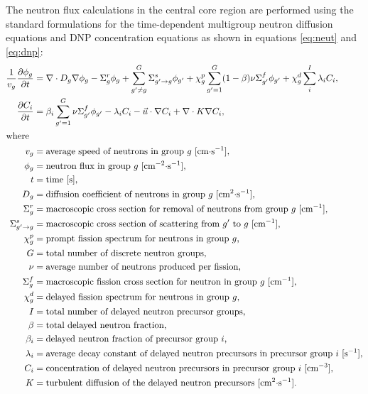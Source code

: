 The neutron flux calculations in the central core region are
performed using the standard formulations for the time-dependent multigroup
neutron diffusion equations and \gls{DNP} concentration equations as shown in
equations \ref{eq:neut} and \ref{eq:dnp}:
%
\begin{align}
    \frac{1}{v_g} \frac{\partial \phi_g}{\partial t} &= \nabla \cdot D_g
    \nabla \phi_g - \Sigma^r_g \phi_g +
    \sum^G_{g' \neq g} \Sigma^s_{g' \rightarrow g} \phi_{g'} + \chi^p_g
    \sum^G_{g'=1} (1-\beta) \nu \Sigma^f_{g'} \phi_{g'} + \chi^d_g \sum^I_i
    \lambda_i C_i, \label{eq:neut} \\
    \frac{\partial C_i}{\partial t} &= \beta_i \sum^G_{g'=1} \nu \Sigma^f_{g'}
    \phi_{g'} - \lambda_i C_i - \vec{u} \cdot \nabla C_i + \nabla \cdot
    K \nabla C_i, \label{eq:dnp} \\
    \intertext{where}
    v_g &= \text{average speed of neutrons in group $g$ [cm$\cdot$s$^{-1}$],} 
    \nonumber \\
    \phi_g &= \text{neutron flux in group $g$ [cm$^{-2}\cdot$s$^{-1}$],}
    \nonumber \\
    t &= \text{time [s],} \nonumber \\
    D_g &= \text{diffusion coefficient of neutrons in group $g$
    [cm$^2\cdot$s$^{-1}$],} \nonumber \\
    \Sigma^r_g &= \text{macroscopic cross section for removal of neutrons from
    group $g$ [cm$^{-1}$],} \nonumber \\
    \Sigma^s_{g' \rightarrow g} &= \text{macroscopic cross section of
    scattering from $g'$ to $g$ [cm$^{-1}$],} \nonumber \\
    \chi^p_g &= \text{prompt fission spectrum for neutrons in group $g$,}
    \nonumber \\
    G &= \text{total number of discrete neutron groups,} \nonumber \\
    \nu &= \text{average number of neutrons produced per fission,} \nonumber
    \\
    \Sigma^f_{g} &= \text{macroscopic fission cross section for neutron in
    group $g$ [cm$^{-1}$],} \nonumber \\
    \chi^d_g &= \text{delayed fission spectrum for neutrons in group $g$,}
    \nonumber \\
    I &= \text{total number of delayed neutron precursor groups,} \nonumber \\
    \beta &= \text{total delayed neutron fraction,} \nonumber \\
    \beta_i &= \text{delayed neutron fraction of precursor group $i$,}
    \nonumber \\
    \lambda_i &= \text{average decay constant of delayed neutron precursors in
    precursor group $i$ [s$^{-1}$],} \nonumber \\
    C_i &= \text{concentration of delayed neutron precursors in precursor
    group $i$ [cm$^{-3}$],} \nonumber \\
    K &= \text{turbulent diffusion of the delayed neutron precursors
    [cm$^2\cdot$s$^{-1}$].} \nonumber
\end{align}
%

